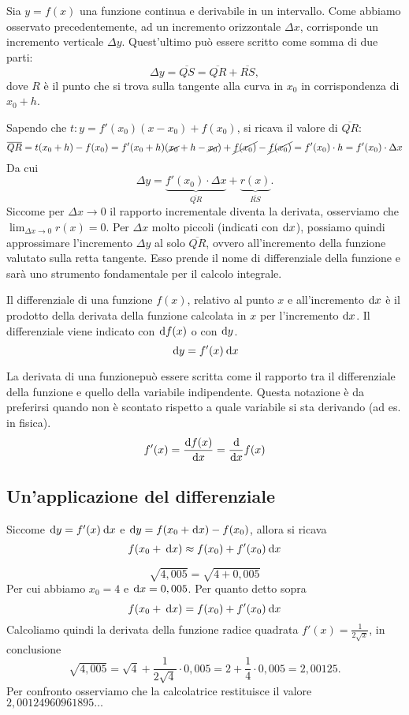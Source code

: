 Sia $y=f(x)$ una funzione continua e derivabile in un intervallo. Come abbiamo osservato precedentemente, ad un incremento orizzontale $\Delta x$, corrisponde un incremento verticale $\Delta y$. Quest'ultimo può essere scritto come somma di due parti:
\[\Delta y=\overline{QS} = \overline{QR}+\overline{RS},\]
dove $R$ è il punto che si trova sulla tangente alla curva in $x_0$ in corrispondenza di $x_0+h$.

Sapendo che $t: y=f'(x_0)(x-x_0)+f(x_0)$, si ricava il valore di $\overline{QR}$:
\[\overline{QR}=t(x_0+h)-f(x_0)=f'(x_0+h)(\cancel{x_0}+h-\cancel{x_0})+\cancel{f(x_0)}-\cancel{f(x_0)}=f'(x_0)\cdot h= f'(x_0)\cdot \Delta x\]
Da cui
\[\Delta y=\underbrace{f'(x_0)\cdot \Delta x}_{\overline{QR}}+\underbrace{r(x)}_{\overline{RS}}.\]
Siccome per $\Delta x\to 0$ il rapporto incrementale diventa la derivata, osserviamo che $\lim_{\Delta x\to 0}r(x)=0$. Per $\Delta x$ molto piccoli (indicati con $\!\:\text{d} x$), possiamo quindi approssimare l'incremento $\Delta y$ al solo $\overline{QR}$, ovvero all'incremento della funzione valutato sulla retta tangente. Esso prende il nome di differenziale della funzione e sarà uno strumento fondamentale per il calcolo integrale.
\begin{boxdef}[Differenziale]
    Il differenziale di una funzione $f(x)$, relativo al punto $x$ e all'incremento $\!\:\text{d} x$ è il prodotto della derivata della funzione calcolata in $x$ per l'incremento $\!\:\text{d} x$. Il differenziale viene indicato con $\!\:\text{d} f(x)$ o con $\!\:\text{d} y$.
    \[\:\text{d} y=f'(x)\:\text{d} x\]
\end{boxdef}
\begin{oss}[Notazione]
    La derivata di una funzionepuò essere scritta come il rapporto tra il differenziale della funzione e quello della variabile indipendente. Questa notazione è da preferirsi quando non è scontato rispetto a quale variabile si sta derivando (ad es. in fisica).
    \[f'(x)=\frac{\!\:\text{d} f(x)}{\!\:\text{d} x}=\frac{\!\:\text{d}}{\!\:\text{d} x}f(x)\]
\end{oss}
\subsection{Un'applicazione del differenziale}
Siccome $\!\:\text{d} y=f'(x)\:\text{d} x$ e $\!\:\text{d} y = f(x_0+\!\:\text{d} x)-f(x_0)$, allora si ricava
\[f(x_0+\:\text{d} x)\approx f(x_0)+f'(x_0)\:\text{d} x\]
\begin{ex}
    \[\sqrt{4,005}=\sqrt{4+0,005}\]
    Per cui abbiamo $x_0=4$ e $\!\:\text{d} x=0,005$. Per quanto detto sopra
    \[f(x_0+\:\text{d} x)=f(x_0)+f'(x_0)\:\text{d} x\]
    Calcoliamo quindi la derivata della funzione radice quadrata $f'(x)=\frac{1}{2\sqrt{x}}$, in conclusione
    \[\sqrt{4,005}=\sqrt{4}+\frac{1}{2\sqrt{4}}\cdot 0,005=2+\frac{1}{4}\cdot 0,005=2,00125.\]
    Per confronto osserviamo che la calcolatrice restituisce il valore $2,00124960961895\dots$
\end{ex}
